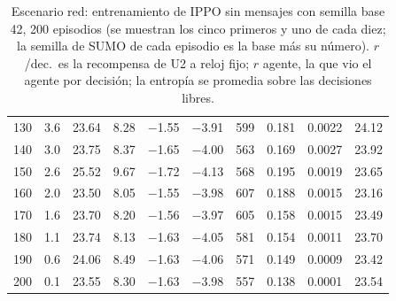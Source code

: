 \begin{table}[H]
\begin{tabular}{rrrrrrrrrr}
130 & 3.6 & 23.64 & 8.28 & $-$1.55 & $-$3.91 & 599 & 0.181 & 0.0022 & 24.12 \\
140 & 3.0 & 23.75 & 8.37 & $-$1.65 & $-$4.00 & 563 & 0.169 & 0.0027 & 23.92 \\
150 & 2.6 & 25.52 & 9.67 & $-$1.72 & $-$4.13 & 568 & 0.195 & 0.0019 & 23.65 \\
160 & 2.0 & 23.50 & 8.05 & $-$1.55 & $-$3.98 & 607 & 0.188 & 0.0015 & 23.16 \\
170 & 1.6 & 23.70 & 8.20 & $-$1.56 & $-$3.97 & 605 & 0.158 & 0.0015 & 23.49 \\
180 & 1.1 & 23.74 & 8.13 & $-$1.63 & $-$4.05 & 581 & 0.154 & 0.0011 & 23.70 \\
190 & 0.6 & 24.06 & 8.49 & $-$1.63 & $-$4.06 & 571 & 0.149 & 0.0009 & 23.42 \\
200 & 0.1 & 23.55 & 8.30 & $-$1.63 & $-$3.98 & 557 & 0.138 & 0.0001 & 23.54 \\
\bottomrule
\end{tabular}
\caption[Escenario red: entrenamiento de IPPO sin mensajes, semilla base 42]{Escenario red: entrenamiento de IPPO sin mensajes con semilla base 42, 200 episodios (se muestran los cinco primeros y uno de cada diez; la semilla de SUMO de cada episodio es la base más su número). $r$/dec.\ es la recompensa de U2 a reloj fijo; $r$ agente, la que vio el agente por decisión; la entropía se promedia sobre las decisiones libres.}
\label{tab:red-ippo-local-42}
\end{table}


